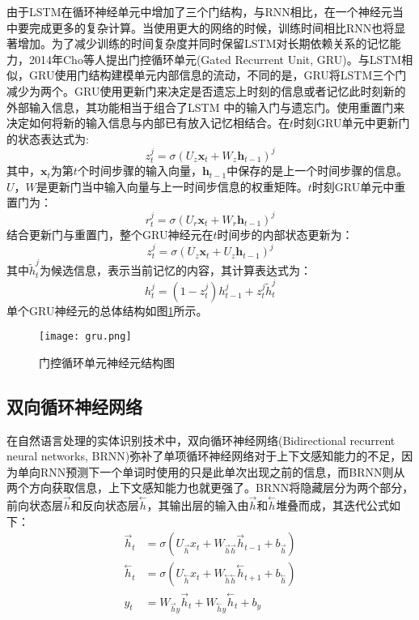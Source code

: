 由于LSTM在循环神经单元中增加了三个门结构，与RNN相比，在一个神经元当中要完成更多的复杂计算。当使用更大的网络的时候，训练时间相比RNN也将显著增加。为了减少训练的时间复杂度并同时保留LSTM对长期依赖关系的记忆能力，2014年Cho等人提出门控循环单元(Gated Recurrent Unit, GRU)。与LSTM相似，GRU使用门结构建模单元内部信息的流动，不同的是，GRU将LSTM三个门减少为两个。GRU使用更新门来决定是否遗忘上时刻的信息或者记忆此时刻新的外部输入信息，其功能相当于组合了LSTM 中的输入门与遗忘门。使用重置门来决定如何将新的输入信息与内部已有放入记忆相结合。在$t$时刻GRU单元中更新门的状态表达式为:
$$
z_{t}^{j}=\sigma\left(U_{z} \mathbf{x}_{t}+W_{z} \mathbf{h}_{t-1}\right)^{j}
$$
其中，$\mathbf{x}_{t}$为第$t$个时间步骤的输入向量，$\mathbf{h}_{t-1}$中保存的是上一个时间步骤的信息。$U$，$W$是更新门当中输入向量与上一时间步信息的权重矩阵。$t$时刻GRU单元中重置门为：
$$
r_{t}^{j}=\sigma\left(U_{r} \mathbf{x}_{t}+W_{r} \mathbf{h}_{t-1}\right)^{j}
$$
结合更新门与重置门，整个GRU神经元在$t$时间步的内部状态更新为：
$$
z_{t}^{j}=\sigma\left(U_{z} \mathbf{x}_{t}+U_{z} \mathbf{h}_{t-1}\right)^{j}
$$
其中$\tilde{h}_{t}^{j}$为候选信息，表示当前记忆的内容，其计算表达式为：
$$
h_{t}^{j}=\left(1-z_{t}^{j}\right) h_{t-1}^{j}+z_{t}^{j} \tilde{h}_{t}^{j}
$$
单个GRU神经元的总体结构如图\ref{fig:gru}所示。

\begin{figure}[htb]
  \centering
  \texttt{[image: gru.png]}\\
  \caption{门控循环单元神经元结构图}
  \label{fig:gru}
\end{figure}

\subsection{双向循环神经网络}

在自然语言处理的实体识别技术中，双向循环神经网络(Bidirectional recurrent neural networks, BRNN)弥补了单项循环神经网络对于上下文感知能力的不足，因为单向RNN预测下一个单词时使用的只是此单次出现之前的信息，而BRNN则从两个方向获取信息，上下文感知能力也就更强了。BRNN将隐藏层分为两个部分，前向状态层$\stackrel{\rightarrow}{h}$和反向状态层$\stackrel{\leftarrow}{h}$，其输出层的输入由$\stackrel{\rightarrow}{h}$和$\stackrel{\leftarrow}{h}$堆叠而成，其迭代公式如下：
\begin{align} 
  \vec{h}_{t} &= \sigma(U_{\vec{h}} x_{t}+W_{\vec{h} \vec{h}} \vec{h}_{t-1}+b_{\vec{h}}) \label{forword}\\
\stackrel{\leftarrow}{h}_{t} &= \sigma(U_{\stackrel{\leftarrow}{h}} x_{t}+W_{\stackrel{\leftarrow}{h} \stackrel{\leftarrow}{h}} \stackrel{\leftarrow}{h}_{t+1}+b_{\stackrel{\leftarrow}{h}}) \label{backword}\\
y_{t} &= W_{\vec{h} y} \vec{h}_{t}+W_{\stackrel{\leftarrow}{h}y} \stackrel{\leftarrow}{h}_{t}+b_{y} \label{stack}
\end{align}

